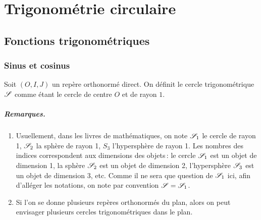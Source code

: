 \chapter{Trigonométrie circulaire}\label{chap_fcttrigo}

\section{Fonctions trigonométriques}
	

	\subsection{Sinus et cosinus}\label{subsec_sincos}
		\begin{defi}
			Soit $(O,I,J)$ un repère orthonormé direct. On définit le cercle trigonométrique $\S$ comme étant le cercle de centre $O$ et de rayon $1$.
		\end{defi}
		\paragraph{Remarques.} 

		\begin{enumerate}
			\item Usuellement, dans les livres de mathématiques, on note $\S_1$ le cercle de rayon 1, $\S_2$ la sphère de rayon 1, $S_3$ l'hypersphère de rayon 1. Les nombres des indices correspondent aux dimensions des objets\,: le cercle $\S_1$ est un objet de dimension 1, la sphère $\S_2$ est un objet de dimension 2, l'hypersphère $\S_3$ est un objet de dimension 3, etc. Comme il ne sera que question de $\S_1$ ici, afin d'alléger les notations, on note par convention $\S=\S_1$.
		
			\item Si l'on se donne plusieurs repères orthonormés du plan, alors on peut envisager plusieurs cercles trigonométriques dans le plan.
		\end{enumerate}

